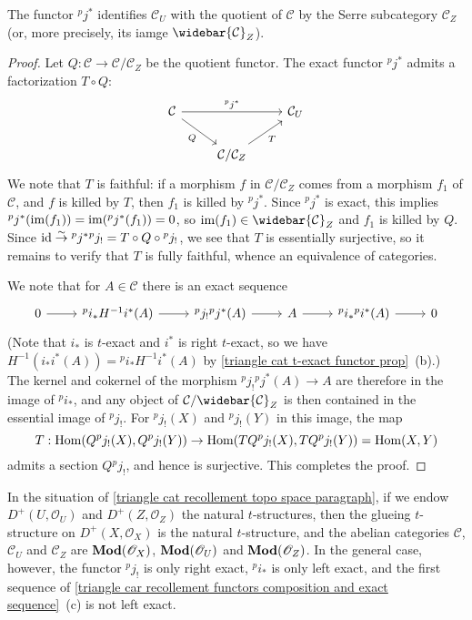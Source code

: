 \begin{proposition}\label{triangle car recollement ^pj^* is quotient}
The functor ${^pj^*}$ identifies $\mathcal{C}_U$ with the quotient of $\mathcal{C}$ by the Serre subcategory $\mathcal{C}_Z$ (or, more precisely, its iamge $\widebar{\mathcal{C}}_Z$).
\end{proposition}
\begin{proof}
Let $Q:\mathcal{C}\to\mathcal{C}/\mathcal{C}_Z$ be the quotient functor. The exact functor ${^pj^*}$ admits a factorization $T\circ Q$:
\[\begin{tikzcd}
\mathcal{C}\ar[rd,swap,"Q"]\ar[rr,"{^pj^*}"]&&\mathcal{C}_U\\
&\mathcal{C}/\mathcal{C}_Z\ar[ru,swap,"T"]
\end{tikzcd}\]
We note that $T$ is faithful: if a morphism $f$ in $\mathcal{C}/\mathcal{C}_Z$ comes from a morphism $f_1$ of $\mathcal{C}$, and $f$ is killed by $T$, then $f_1$ is killed by ${^pj^*}$. Since ${^pj^*}$ is exact, this implies ${^pj^*}(\operatorname{im}(f_1))=\operatorname{im}({^pj^*}(f_1))=0$, so $\im(f_1)\in\widebar{\mathcal{C}}_Z$ and $f_1$ is killed by $Q$. Since $\operatorname{id}\stackrel{\sim}{\to}{^pj^*}{^pj_!}=T\circ Q\circ{^pj_!}$, we see that $T$ is essentially surjective, so it remains to verify that $T$ is fully faithful, whence an equivalence of categories.\par
We note that for $A\in\mathcal{C}$ there is an exact sequence
\[\begin{tikzcd}
0\ar[r]&{^pi_*}H^{-1}i^*(A)\ar[r]&{^pj_!}{^pj^*}(A)\ar[r]&A\ar[r]&{^pi_*}{^pi^*}(A)\ar[r]&0
\end{tikzcd}\]
(Note that $i_*$ is $t$-exact and $i^*$ is right $t$-exact, so we have $H^{-1}(i_*i^*(A))={^pi_*}H^{-1}i^*(A)$ by \cref{triangle cat t-exact functor prop}~(b).) The kernel and cokernel of the morphism ${^pj_!}{^pj^*}(A)\to A$ are therefore in the image of ${^pi_*}$, and any object of $\mathcal{C}/\widebar{\mathcal{C}}_Z$ is then contained in the essential image of ${^pj_!}$. For ${^pj_!}(X)$ and ${^pj_!}(Y)$ in this image, the map
\[T:\mathrm{Hom}(Q{^pj_!}(X),Q{^pj_!}(Y))\to\mathrm{Hom}(TQ{^pj_!}(X),TQ{^pj_!}(Y))=\mathrm{Hom}(X,Y)\]
admits a section $Q{^pj_!}$, and hence is surjective. This completes the proof.
\end{proof}

\begin{remark}
In the situation of \ref{triangle cat recollement topo space paragraph}, if we endow $D^+(U,\mathscr{O}_U)$ and $D^+(Z,\mathscr{O}_Z)$ the natural $t$-structures, then the glueing $t$-structure on $D^+(X,\mathscr{O}_X)$ is the natural $t$-structure, and the abelian categories $\mathcal{C}$, $\mathcal{C}_U$ and $\mathcal{C}_Z$ are $\mathbf{Mod}(\mathscr{O}_X)$, $\mathbf{Mod}(\mathscr{O}_U)$ and $\mathbf{Mod}(\mathscr{O}_Z)$. In the general case, however, the functor ${^pj_!}$ is only right exact, ${^pi_*}$ is only left exact, and the first sequence of \cref{triangle car recollement functors composition and exact sequence}~(c) is not left exact.
\end{remark}

